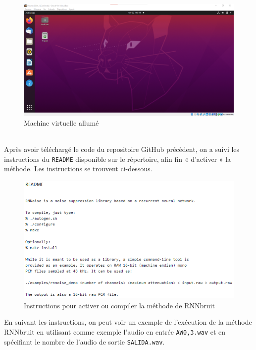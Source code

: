 \documentclass[conference,onecolumn]{IEEEtran}
\begin{document}
 \begin{figure}[H]
 \centering
    \includegraphics[scale=0.45]{VM2.png}
    \caption{Machine virtuelle allumé} 
\end{figure}
\hfill\\
Après avoir téléchargé le code du repositoire GitHub précèdent, on a suivi les instructions du \texttt{README} disponible sur le répertoire, afin fin « d’activer » la méthode. Les instructions se trouvent ci-dessous.

 \begin{figure}[H]
 \centering
    \includegraphics[scale=0.7]{VM3.png}
    \caption{Instructions pour activer ou compiler la méthode de RNNbruit} 
\end{figure}

En suivant les instructions, on peut voir un exemple de l’exécution de la méthode RNNbruit en utilisant comme exemple l’audio en entrée \texttt{AW0,3.wav} et en spécifiant le nombre de l’audio de sortie \texttt{SALIDA.wav}.
\end{document}

